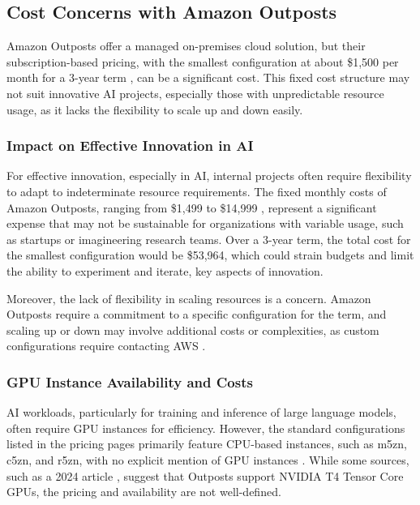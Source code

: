 \documentclass[11pt]{article}
\begin{document}
\subsection{Cost Concerns with Amazon Outposts}

Amazon Outposts offer a managed on-premises cloud solution, but their subscription-based pricing, with the smallest configuration at about \$1,500 per month for a 3-year term \cite{aws_outposts_pricing}, can be a significant cost. This fixed cost structure may not suit innovative AI projects, especially those with unpredictable resource usage, as it lacks the flexibility to scale up and down easily.

\subsubsection{Impact on Effective Innovation in AI}

For effective innovation, especially in AI, internal projects often require flexibility to adapt to indeterminate resource requirements. The fixed monthly costs of Amazon Outposts, ranging from \$1,499 to \$14,999 \cite{aws_outposts_pricing}, represent a significant expense that may not be sustainable for organizations with variable usage, such as startups or imagineering research teams. Over a 3-year term, the total cost for the smallest configuration would be \$53,964, which could strain budgets and limit the ability to experiment and iterate, key aspects of innovation.

Moreover, the lack of flexibility in scaling resources is a concern. Amazon Outposts require a commitment to a specific configuration for the term, and scaling up or down may involve additional costs or complexities, as custom configurations require contacting AWS \cite{aws_outposts_pricing}.

\subsubsection{GPU Instance Availability and Costs}

AI workloads, particularly for training and inference of large language models, often require GPU instances for efficiency. However, the standard configurations listed in the pricing pages primarily feature CPU-based instances, such as m5zn, c5zn, and r5zn, with no explicit mention of GPU instances \cite{aws_outposts_features}. While some sources, such as a 2024 article \cite{nvidia_aws}, suggest that Outposts support NVIDIA T4 Tensor Core GPUs, the pricing and availability are not well-defined.
\end{document}
